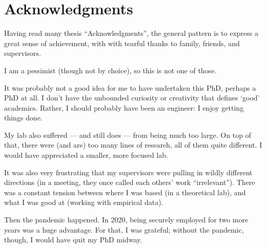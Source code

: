 

\bigskip

\begingroup
\let\clearpage\relax
\let\cleardoublepage\relax
\let\cleardoublepage\relax
\chapter*{Acknowledgments}

Having read many thesis ``Acknowledgments'', the general pattern is to express a great sense of achievement, with with tearful thanks to family, friends, and supervisors.

\noindent I am a pessimist (though not by choice), so this is not one of those.

It was probably not a good idea for me to have undertaken this PhD, perhaps a PhD at all.
I don't have the unbounded curiosity or creativity that defines `good' academics.
Rather, I should probably have been an engineer: I enjoy getting things done.

My lab also suffered --- and still does --- from being much too large. 
On top of that, there were (and are) too many lines of research, all of them quite different.
I would have appreciated a smaller, more focused lab.

It was also very frustrating that my supervisors were pulling in wildly different directions (in a meeting, they once called each others' work ``irrelevant'').
There was a constant tension between where I was based (in a theoretical lab), and what I was good at (working with empirical data).

Then the pandemic happened.
In 2020, being securely employed for two more years was a huge advantage.
For that, I was grateful; without the pandemic, though, I would have quit my PhD midway.

